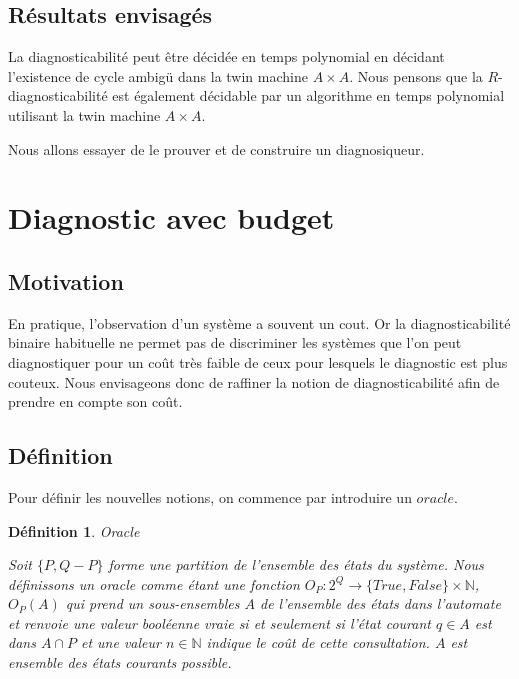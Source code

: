 \documentclass[a4paper,10pt]{article}
\newtheorem{mydef}{D\'efinition}
\begin{document}
\subsection{R\'esultats envisag\'es}

La diagnosticabilit\'e peut \^etre d\'ecid\'ee en temps polynomial en d\'ecidant l'existence de cycle ambig\"u dans la twin machine $A\times A$. Nous pensons que la $R$-diagnosticabilit\'e est \'egalement d\'ecidable par un algorithme en temps polynomial utilisant la twin machine $A\times A$.

Nous allons essayer de le prouver et de construire un diagnosiqueur.





\section{Diagnostic avec budget}
\subsection{Motivation}

En pratique, l'observation d'un système a souvent un cout. Or la diagnosticabilité binaire habituelle ne permet pas de discriminer les systèmes que l'on peut diagnostiquer pour un coût très faible de ceux pour lesquels le diagnostic est plus couteux. Nous envisageons donc de raffiner la notion de diagnosticabilit\'e afin de prendre en compte son coût.


\subsection{D\'efinition}

Pour d\'efinir les nouvelles notions, on commence par introduire un $oracle$.

\begin{mydef}{Oracle}

  Soit $\{P,Q-P\}$ forme une partition de l'ensemble des \'etats du syst\`eme. Nous d\'efinissons un oracle comme \'etant une fonction $O_P: 2^Q \to \{True,False\} \times \mathbb{N}$, $O_P(A)$ qui prend un sous-ensembles $A$ de l'ensemble des \'etats dans l'automate et renvoie une valeur bool\'eenne vraie si et seulement si l'\'etat courant $q\in A$ est dans $A\cap P$ et une valeur $n \in \mathbb{N}$ indique le co\^ut de cette consultation. $A$ est ensemble des \'etats courants possible.

\end{mydef}
\end{document}
